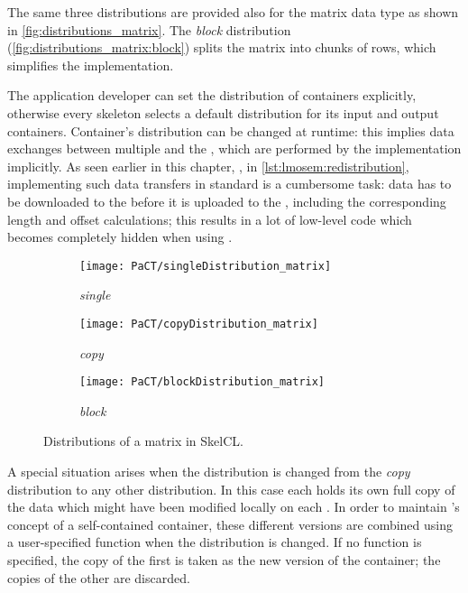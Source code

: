 The same three distributions are provided also for the matrix data type as shown in \autoref{fig:distributions_matrix}.
The \emph{block} distribution (\autoref{fig:distributions_matrix:block}) splits the matrix into chunks of rows, which simplifies the implementation.

The application developer can set the distribution of containers explicitly, otherwise every skeleton selects a default distribution for its input and output containers.
Container's distribution can be changed at runtime:
this implies data exchanges between multiple \GPUs and the \CPU, which are performed by the \SkelCL implementation implicitly.
As seen earlier in this chapter, \eg, in \autoref{lst:lmosem:redistribution}, implementing such data transfers in standard \OpenCL is a cumbersome task:
data has to be downloaded to the \CPU before it is uploaded to the \GPUs, including the corresponding length and offset calculations;
this results in a lot of low-level code which becomes completely hidden when using \SkelCL.

\begin{figure}[tbp]
  \centering
  \begin{subfigure}{.22\textwidth}
    \texttt{[image: PaCT/singleDistribution\_matrix]}
    \caption{\emph{single}}
    \label{fig:distributions_matrix:single}
  \end{subfigure}
  \hfill
  \begin{subfigure}{.22\textwidth}
    \texttt{[image: PaCT/copyDistribution\_matrix]}
    \caption{\emph{copy}}
    \label{fig:distributions_matrix:copy}
  \end{subfigure}
  \hfill
  \begin{subfigure}{.22\textwidth}
    \texttt{[image: PaCT/blockDistribution\_matrix]}
    \caption{\emph{block}}
    \label{fig:distributions_matrix:block}
  \end{subfigure}
  \caption{Distributions of a matrix in SkelCL.}
  \label{fig:distributions_matrix}
\end{figure}

A special situation arises when the distribution is changed from the \emph{copy} distribution to any other distribution.
In this case each \GPU holds its own full copy of the data which might have been modified locally on each \GPU.
In order to maintain \SkelCL's concept of a self-contained container, these different versions are combined using a user-specified function when the distribution is changed.
If no function is specified, the copy of the first \GPU is taken as the new version of the container; the copies of the other \GPUs are discarded.


